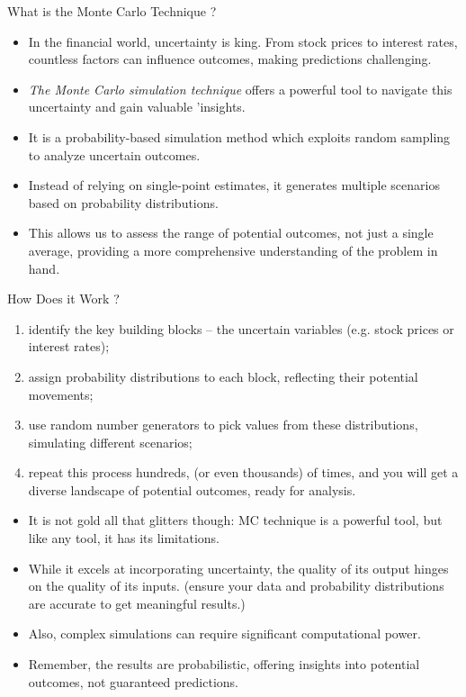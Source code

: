\documentclass{beamer}
\begin{document}
\begin{frame}{What is the Monte Carlo Technique ?}
\begin{itemize}
	\item In the financial world, uncertainty is king. From stock prices to interest rates, countless factors can influence outcomes, making predictions challenging. 
	\item \emph{The Monte Carlo simulation technique} offers a powerful tool to navigate this uncertainty and gain valuable 'insights.
	\item It is a probability-based simulation method which exploits random sampling to analyze uncertain outcomes.
	\item Instead of relying on single-point estimates, it generates multiple scenarios based on probability distributions. 
	\item This allows us to assess the range of potential outcomes, not just a single average, providing a more comprehensive understanding of the problem in hand.
\end{itemize}
\end{frame}

\begin{frame}{How Does it Work ?}
\begin{enumerate}
	\item identify the key building blocks – the uncertain variables (e.g. stock prices or interest rates);
	\item assign probability distributions to each block, reflecting their potential movements;
	\item use random number generators to pick values from these distributions, simulating different scenarios;
	\item repeat this process hundreds, (or even thousands) of times, and you will get a diverse landscape of potential outcomes, ready for analysis.
\end{enumerate}
\begin{itemize}
	\item It is not gold all that glitters though: MC technique is a powerful tool, but like any tool, it has its limitations. 
	\item While it excels at incorporating uncertainty, the quality of its output hinges on the quality of its inputs. (ensure your data and probability distributions are accurate to get meaningful results.)
	\item Also, complex simulations can require significant computational power. 
	\item Remember, the results are probabilistic, offering insights into potential outcomes, not guaranteed predictions.
\end{itemize}
\end{frame}
\end{document}
